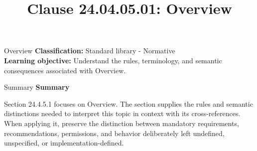 \documentclass[10pt,letterpaper]{article}
\title{Clause 24.04.05.01: Overview}
\author{}
\date{}
\begin{document}
\maketitle
\begin{CornellOverviewBox}{Overview}
\textbf{Classification:} Standard library - Normative\\[2pt]
\textbf{Learning objective:} Understand the rules, terminology, and semantic consequences associated with Overview.
\end{CornellOverviewBox}\begin{CornellSummaryBox}{Summary}
{\sffamily\bfseries\color{Accent} Summary}\par\vspace{3pt}Section 24.4.5.1 focuses on Overview. The section supplies the rules and semantic distinctions needed to interpret this topic in context with its cross-references. When applying it, preserve the distinction between mandatory requirements, recommendations, permissions, and behavior deliberately left undefined, unspecified, or implementation-defined.
\end{CornellSummaryBox}
\end{document}
